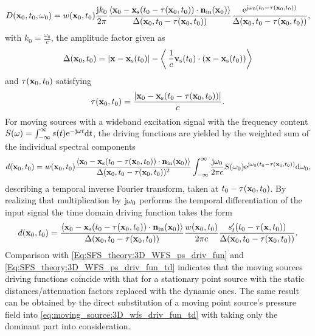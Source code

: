 \begin{equation}
D(\mathbf{x}_0,t_0,\omega_0) =  w(\mathbf{x}_0,t_0) 
\frac{\mathrm{j} k_0}{2\pi} \frac{\left< \mathbf{x}_0 -\mathbf{x}_{\mathrm{s}}(t_0-\tau(\mathbf{x}_0,t_0)) \cdot \mathbf{n}_{\mathrm{in}}(\mathbf{x}_0) \right>}{\Delta(\mathbf{x}_0,t_0-\tau(\mathbf{x}_0,t_0))}
\frac{\mathrm{e}^{\mathrm{j} \omega_0\left( t_0 - \tau( \mathbf{x}_0,t_0 )\right)}}{\Delta(\mathbf{x}_0,t_0-\tau( \mathbf{x}_0, t_0 ))},
\end{equation}
with $k_0 = \frac{\omega_0}{c}$, the amplitude factor given as
\begin{equation}
\Delta( \mathbf{x}_0,t_0 ) = |\mathbf{x} - \mathbf{x}_{\mathrm{s}}(t_0)| - \left<\, \frac{1}{c}\mathbf{v}_{\mathrm{s}}(t_0) \cdot (\mathbf{x} - \mathbf{x}_{\mathrm{s}}(t_0)) \right> 
\end{equation}
and $\tau(\mathbf{x}_0,t_0)$ satisfying 
\begin{equation}
\tau(\mathbf{x}_0,t_0) =  \frac{| \mathbf{x}_0 - \mathbf{x}_{\mathrm{s}}( t_0 - \tau(\mathbf{x}_0,t_0)) |  }{c}.
\end{equation}
For moving sources with a wideband excitation signal with the frequency content $S(\omega) = \int_{-\infty}^{\infty} s(t) \mathrm{e}^{-\mathrm{j} \omega t} \mathrm{d} t$, the driving functions are yielded by the weighted sum of the individual spectral components 
\begin{equation}
d(\mathbf{x}_0,t_0) =  w(\mathbf{x}_0,t_0)  
\frac{\left< \mathbf{x}_0 -\mathbf{x}_{\mathrm{s}}(t_0-\tau(\mathbf{x}_0,t_0)) \cdot \mathbf{n}_{\mathrm{in}}(\mathbf{x}_0) \right>}{\Delta(\mathbf{x}_0,t_0-\tau(\mathbf{x}_0,t_0))^2}
\int_{-\infty}^{\infty} \frac{\mathrm{j} \omega_0}{2\pi c} S(\omega_0 )\mathrm{e}^{\mathrm{j} \omega_0\left( t_0 - \tau( \mathbf{x}_0,t_0 )\right)} \mathrm{d} \omega_0,
\end{equation}
describing a temporal inverse Fourier transform, taken at $t_0 - \tau( \mathbf{x}_0,t_0 )$.
By realizing that multiplication by $\mathrm{j} \omega_0$ performs the temporal differentiation of the input signal the time domain driving function takes the form 
\begin{equation}
d(\mathbf{x}_0,t_0) =   
\frac{\left< \mathbf{x}_0 -\mathbf{x}_{\mathrm{s}}(t_0-\tau(\mathbf{x}_0,t_0)) \cdot \mathbf{n}_{\mathrm{in}}(\mathbf{x}_0) \right>}{\Delta(\mathbf{x}_0,t_0-\tau(\mathbf{x}_0,t_0))}
\frac{w(\mathbf{x}_0,t_0)}{2\pi c} \frac{s'_t( t_0 - \tau( \mathbf{x},t_0 ) )}{\Delta(\mathbf{x}_0,t_0-\tau(\mathbf{x}_0,t_0))}.
\end{equation}	
Comparison with \eqref{Eq:SFS_theory:3D_WFS_ps_driv_fun} and \eqref{Eq:SFS_theory:3D_WFS_ps_driv_fun_td} indicates that the moving sources driving functions coincide with that for a stationary point source with the static distances/attenuation factors replaced with the dynamic ones.
The same result can be obtained by the direct substitution of a moving point source's pressure field into \eqref{eq:moving_source:3D_wfs_driv_fun_td} with taking only the dominant part into consideration.

